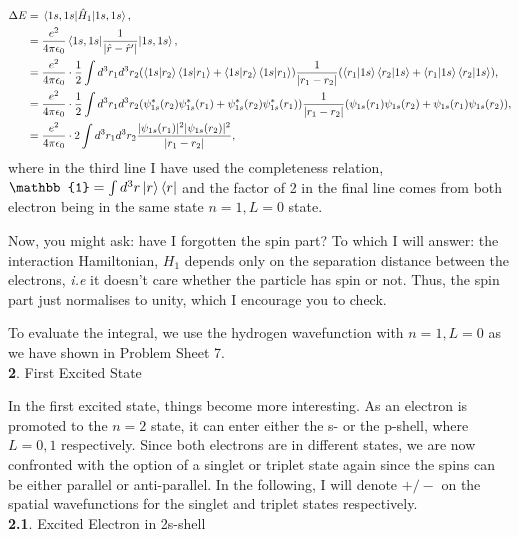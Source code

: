 \documentclass{article}
\numberwithin{equation}{section} %
\begin{document}
\begin{equation}
\begin{split}
\Delta E&=\mel{1s,1s}{\hat{H}_1}{1s,1s},\\
&= \frac{e^2}{4\pi\epsilon_0}\mel{1s,1s}{\frac{1}{\vert \hat{r}-\hat{r}'\vert}}{1s,1s},\\
&=\frac{e^2}{4\pi\epsilon_0}\cdot \frac{1}{2}\int d^3r_1d^3r_2 (\bra{1s}\ket{r_2}\bra{1s}\ket{r_1} + \bra{1s}\ket{r_2}\bra{1s}\ket{r_1})\frac{1}{\vert r_1-r_2\vert}(\bra{r_1}\ket{1s}\bra{r_2}\ket{1s} + \bra{r_1}\ket{1s}\bra{r_2}\ket{1s}),\\
&=\frac{e^2}{4\pi\epsilon_0}\cdot \frac{1}{2}\int d^3r_1d^3r_2 (\psi^*_{1s}(r_2)\psi^*_{1s}(r_1) + \psi^*_{1s}(r_2)\psi^*_{1s}(r_1))\frac{1}{\vert r_1-r_2\vert}(\psi_{1s}(r_1)\psi_{1s}(r_2) + \psi_{1s}(r_1)\psi_{1s}(r_2)),\\
&=\frac{e^2}{4\pi\epsilon_0}\cdot 2\int d^3r_1d^3r_2  \frac{\vert\psi_{1s}(r_1)\vert^2\vert\psi_{1s}(r_2)\vert^2}{\vert r_1-r_2\vert},\\
\end{split}
\end{equation}
where in the third line I have used the completeness relation, $\mathbb{1}=\int d^3r \ket{r}\bra{r}$ and the factor of 2 in the final line comes from both electron being in the same state $n=1, L=0$ state.

Now, you might ask: have I forgotten the spin part? To which I will answer: the interaction Hamiltonian, $H_1$ depends only on the separation distance between the electrons, \textit{i.e} it doesn't care whether the particle has spin or not. Thus, the spin part just normalises to unity, which I encourage you to check.

To evaluate the integral, we use the hydrogen wavefunction with $n=1, L=0$ as we have shown in Problem Sheet 7.\\

\noindent\textbf{2}. First Excited State

In the first excited state, things become more interesting. As an electron is promoted to the $n=2$ state, it can enter either the s- or the p-shell, where $L=0, 1$ respectively. Since both electrons are in different states, we are now confronted with the option of a singlet or triplet state again since the spins can be either parallel or anti-parallel. In the following, I will denote $+/-$ on the spatial wavefunctions for the singlet and triplet states respectively. \\

\noindent\textbf{2.1}. Excited Electron in 2s-shell
\end{document}
